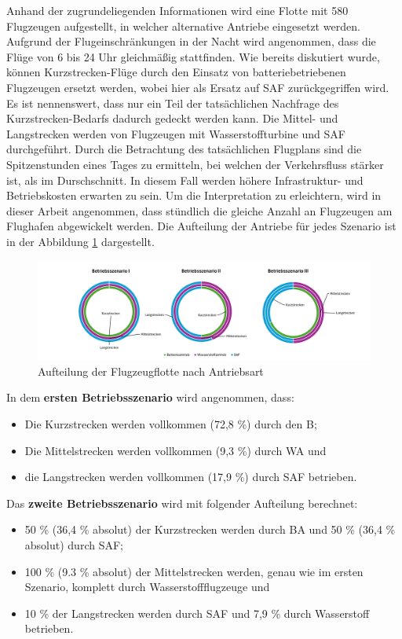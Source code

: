 Anhand der zugrundeliegenden Informationen wird eine Flotte mit 580 Flugzeugen aufgestellt, 
in welcher alternative Antriebe eingesetzt werden.
Aufgrund der Flugeinschränkungen in der Nacht wird angenommen, 
dass die Flüge von 6 bis 24 Uhr gleichmäßig stattfinden. 
Wie bereits diskutiert wurde, können Kurzstrecken-Flüge durch 
den Einsatz von batteriebetriebenen Flugzeugen ersetzt werden, 
wobei hier als Ersatz auf SAF zurückgegriffen wird. 
Es ist nennenswert, dass nur ein Teil der tatsächlichen Nachfrage des Kurzstrecken-Bedarfs 
dadurch gedeckt werden kann. 
Die Mittel- und Langstrecken werden von Flugzeugen mit Wasserstoffturbine und SAF durchgeführt.
%
Durch die Betrachtung des tatsächlichen Flugplans sind die Spitzenstunden eines Tages zu ermitteln, 
bei welchen der Verkehrsfluss stärker ist, als im Durschschnitt.
In diesem Fall werden höhere Infrastruktur- und Betriebskosten erwarten zu sein.
Um die Interpretation zu erleichtern, wird in dieser Arbeit angenommen, 
dass stündlich die gleiche Anzahl an Flugzeugen am Flughafen abgewickelt werden. 
%
Die Aufteilung der Antriebe für jedes Szenario ist in der Abbildung \ref{betriebsszenarien} dargestellt.
%
\begin{figure}[h]
	\centering
	\includegraphics[width=1.0\linewidth]{Bilder/Betriebsszenarien.png}
	\caption[Betriebsszenarien]{Aufteilung der Flugzeugflotte nach Antriebsart}
	\label{betriebsszenarien}
\end{figure}
%
In dem \textbf{ersten Betriebsszenario} wird angenommen, dass:
\begin{itemize}
    \item Die Kurzstrecken werden vollkommen (72,8 \%) durch den B;
    \item Die Mittelstrecken werden vollkommen (9,3 \%) durch WA und
    \item die Langstrecken werden vollkommen (17,9 \%) durch SAF betrieben.
\end{itemize}
Das \textbf{zweite Betriebsszenario} wird mit folgender Aufteilung berechnet:
\begin{itemize}
    \item 50 \% (36,4 \% absolut) der Kurzstrecken werden durch BA und 50 \% (36,4 \% absolut) durch SAF; 
    \item 100 \% (9.3 \% absolut) der Mittelstrecken werden, genau wie im ersten Szenario, komplett durch Wasserstoffflugzeuge und
    \item 10 \% der Langstrecken werden durch SAF und 7,9 \% durch Wasserstoff betrieben.
\end{itemize}
